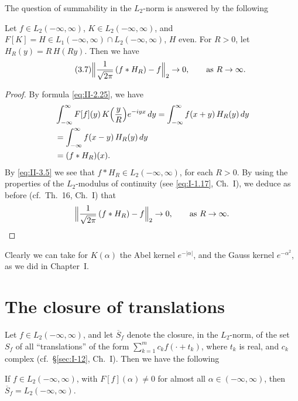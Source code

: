 The question of summability in the $L_{2}$-norm is answered by the following

\begin{theorem}\label{thm:II-5}
Let $f\in L_{2}(-\infty,\infty)$, $K\in L_{2}(-\infty,\infty)$, and $F[K]=H\in L_{1}(-\infty,\infty)\cap L_{2}(-\infty,\infty)$, $H$ even. For $R>0$, let $H_{R}(y)=R\,H(Ry)$. Then we have
\begin{equation*}\tag{3.7}\label{eq:II-3.7}
\Bigl\|\frac{1}{\sqrt{2\pi}}\,(f*H_{R})-f\Bigr\|_{2}\to 0,\qquad\text{as }R\to\infty.
\end{equation*}
\end{theorem}
\begin{proof}
By formula \eqref{eq:II-2.25}, we have
\[
\begin{aligned}
&\int_{-\infty}^{\infty}F[f](y)\,K\Bigl(\frac{y}{R}\Bigr)e^{-iyx}\,dy = \int_{-\infty}^{\infty}f(x+y)\,H_{R}(y)\,dy\\
&= \int_{-\infty}^{\infty}f(x-y)\,H_{R}(y)\,dy\\
&= (f*H_{R})(x).
\end{aligned}
\]
By \eqref{eq:II-3.5} we see that $f*H_{R}\in L_{2}(-\infty,\infty)$, for each $R>0$. By using the properties of the $L_{2}$-modulus of continuity (see \eqref{eq:I-1.17}, Ch.~I), we deduce as before (cf.\ Th.~16, Ch.~I) that
\[
\Bigl\|\frac{1}{\sqrt{2\pi}}\,(f*H_{R})-f\Bigr\|_{2}\to 0,\qquad\text{as }R\to\infty.
\]
\end{proof}
\begin{remark}
Clearly we can take for $K(\alpha)$ the Abel kernel $e^{-|\alpha|}$, and the Gauss kernel $e^{-\alpha^{2}}$, as we did in Chapter~I.
\end{remark}

\setcounter{section}{3}
\section{The closure of translations}
\label{sec:II-4}

Let $f\in L_{2}(-\infty,\infty)$, and let $\overline{S}_{f}$ denote the closure, in the $L_{2}$-norm, of the set $S_{f}$ of all ``translations'' of the form $\sum_{k=1}^{m}c_{k}f(\cdot+t_{k})$, where $t_{k}$ is real, and $c_{k}$ complex (cf.\ \S\ref{sec:I-12}, Ch.~I). Then we have the following

\begin{theorem}[Wiener]\label{thm:II-6}
If $f\in L_{2}(-\infty,\infty)$, with $F[f](\alpha)\neq 0$ for almost all $\alpha\in(-\infty,\infty)$, then $\overline{S}_{f}=L_{2}(-\infty,\infty)$.
\end{theorem}

